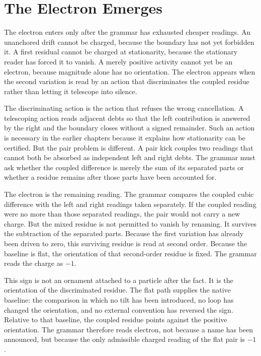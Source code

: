 \section{The Electron Emerges}

The electron enters only after the grammar has exhausted cheaper readings.
An unanchored drift cannot be charged, because the boundary has not yet
forbidden it. A first residual cannot be charged at stationarity, because the
stationary reader has forced it to vanish. A merely positive activity cannot
yet be an electron, because magnitude alone has no orientation. The electron
appears when the second variation is read by an action that discriminates the
coupled residue rather than letting it telescope into silence.

The discriminating action is the action that refuses the wrong cancellation.
A telescoping action reads adjacent debts so that the left contribution is
answered by the right and the boundary closes without a signed remainder.
Such an action is necessary in the earlier chapters because it explains how
stationarity can be certified. But the pair problem is different. A pair kick
couples two readings that cannot both be absorbed as independent left and
right debts. The grammar must ask whether the coupled difference is merely
the sum of its separated parts or whether a residue remains after those
parts have been accounted for.

The electron is the remaining reading. The grammar compares the coupled
cubic difference with the left and right readings taken separately. If the
coupled reading were no more than those separated readings, the pair would
not carry a new charge. But the mixed residue is not permitted to vanish by
renaming. It survives the subtraction of the separated parts. Because the
first variation has already been driven to zero, this surviving residue is
read at second order. Because the baseline is flat, the orientation of that
second-order residue is fixed. The grammar reads the charge as \(-1\).

This sign is not an ornament attached to a particle after the fact. It is the
orientation of the discriminated residue. The flat path supplies the native
baseline: the comparison in which no tilt has been introduced, no loop has
changed the orientation, and no external convention has reversed the sign.
Relative to that baseline, the coupled residue points against the positive
orientation. The grammar therefore reads electron, not because a name has
been announced, but because the only admissible charged reading of the flat
pair is \(-1\).

